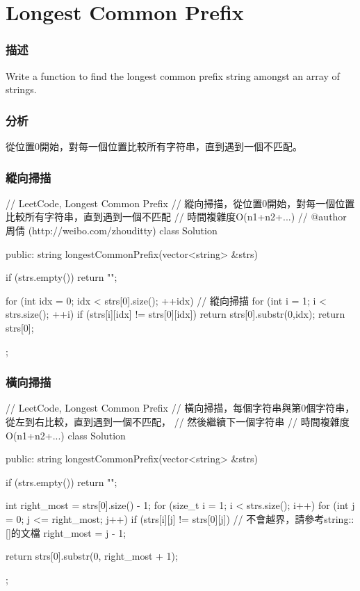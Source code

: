 \section{Longest Common Prefix} %
\label{sec:longest-common-prefix}


\subsubsection{描述}
Write a function to find the longest common prefix string amongst an array of strings.


\subsubsection{分析}
從位置0開始，對每一個位置比較所有字符串，直到遇到一個不匹配。


\subsubsection{縱向掃描}
\begin{Code}
// LeetCode, Longest Common Prefix
// 縱向掃描，從位置0開始，對每一個位置比較所有字符串，直到遇到一個不匹配
// 時間複雜度O(n1+n2+...)
// @author 周倩 (http://weibo.com/zhouditty)
class Solution {
public:
    string longestCommonPrefix(vector<string> &strs) {
        if (strs.empty()) return "";

        for (int idx = 0; idx < strs[0].size(); ++idx) { // 縱向掃描
            for (int i = 1; i < strs.size(); ++i) {
                if (strs[i][idx] != strs[0][idx]) return strs[0].substr(0,idx);
            }
        }
        return strs[0];
    }
};
\end{Code}


\subsubsection{橫向掃描}
\begin{Code}
// LeetCode, Longest Common Prefix
// 橫向掃描，每個字符串與第0個字符串，從左到右比較，直到遇到一個不匹配，
// 然後繼續下一個字符串
// 時間複雜度O(n1+n2+...)
class Solution {
public:
    string longestCommonPrefix(vector<string> &strs) {
        if (strs.empty()) return "";

        int right_most = strs[0].size() - 1;
        for (size_t i = 1; i < strs.size(); i++)
            for (int j = 0; j <= right_most; j++)
                if (strs[i][j] != strs[0][j])  // 不會越界，請參考string::[]的文檔
                    right_most = j - 1;

        return strs[0].substr(0, right_most + 1);
    }
};
\end{Code}


